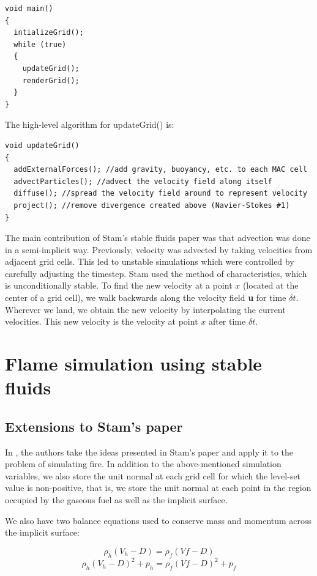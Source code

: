 \documentclass[a4paper]{report}
\begin{document}
\lstset{language=C++}
\begin{lstlisting}
void main()
{
  intializeGrid();
  while (true)
  {
    updateGrid();
    renderGrid();
  }
}
\end{lstlisting}

The high-level algorithm for updateGrid() is:
\lstset{language=C++}
\begin{lstlisting}
void updateGrid()
{
  addExternalForces(); //add gravity, buoyancy, etc. to each MAC cell
  advectParticles(); //advect the velocity field along itself
  diffuse(); //spread the velocity field around to represent velocity
  project(); //remove divergence created above (Navier-Stokes #1)
}
\end{lstlisting}

The main contribution of Stam's stable fluids paper was that advection was done in a semi-implicit way. Previously, velocity was advected by taking velocities from adjacent grid cells. This led to unstable simulations which were controlled by carefully adjusting the timestep. Stam used the method of characteristics, which is unconditionally stable. To find the new velocity at a point $x$ (located at the center of a grid cell), we walk backwards along the velocity field \textbf{u} for time $\delta t$. Wherever we land, we obtain the new velocity by interpolating the current velocities. This new velocity is the velocity at point $x$ after time $\delta t$.

\section{Flame simulation using stable fluids}

\subsection{Extensions to Stam's paper}

In \cite{ngfeje}, the authors take the ideas presented in Stam's paper and apply it to the problem of simulating fire. In addition to the above-mentioned simulation variables, we also store the unit normal at each grid cell for which the level-set value is non-positive, that is, we store the unit normal at each point in the region occupied by the gaseous fuel as well as the implicit surface.

We also have two balance equations used to conserve mass and momentum across the implicit surface:

\begin{equation}
\rho_h(V_h - D) = \rho_f(Vf - D)
\end{equation}
\begin{equation}
\rho_h(V_h - D)^2 + p_h = \rho_f(Vf - D)^2 + p_f
\end{equation}
\end{document}
